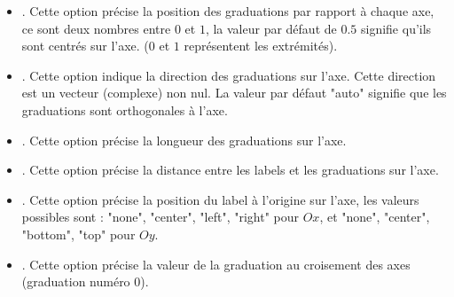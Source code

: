 \begin{itemize}
\begin{itemize}
            \item {}. Cette option précise la position des graduations par rapport à chaque axe, ce sont deux nombres entre $0$ et $1$, la valeur par défaut de $0.5$ signifie qu'ils sont centrés sur l'axe. ($0$ et $1$ représentent les extrémités).
            \item {}. Cette option indique la direction des graduations sur l'axe. Cette direction est un vecteur (complexe) non nul. La valeur par défaut "auto" signifie que les graduations sont orthogonales à l'axe.
            \item {}. Cette option précise la longueur des graduations sur l'axe.
            \item {}. Cette option précise la distance entre les labels et les graduations sur l'axe.
            \item {}. Cette option précise la position du label à l'origine sur l'axe, les valeurs possibles sont : "none", "center", "left", "right" pour $Ox$, et "none", "center", "bottom", "top" pour $Oy$.
            \item {}. Cette option précise la valeur de la graduation au croisement des axes (graduation numéro $0$). 
            

\end{itemize}
\end{itemize}
